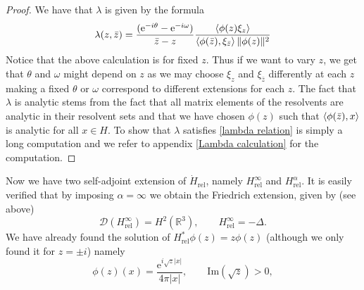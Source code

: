 \documentclass[a4paper,11pt]{article}
\newcommand{\euler}[1]{\text{e}^{#1}}
\newcommand{\Imag}{\text{Im}}
\newcommand{\dom}[1]{\mathscr D\left(#1\right)}
\newcommand{\R}{\mathbb{R}}
\numberwithin{equation}{section}
\begin{document}
\begin{proof}
	We have that $ \lambda $ is given by the formula \begin{equation}
	\lambda(z,\bar{z})=\frac{(\euler{-i\theta}-\euler{-i\omega})}{\bar{z}-z}\frac{\braket{\phi(z)\xi_{z}}}{\braket{\phi(\bar{z}),\xi_{\bar{z}}}\|\phi(z)\|^2}
	\end{equation}
Notice that the above calculation is for fixed $ z $. Thus if we want to vary $ z $, we get that $ \theta $ and $ \omega $ might depend on $ z $ as we may choose $ \xi_z $ and $ \xi_{\bar{z}} $ differently at each $ z $ making a fixed $ \theta $ or $ \omega $ correspond to different extensions for  each $ z $.
 The fact that $ \lambda $ is analytic stems from the fact that all matrix elements of the resolvents are analytic in their resolvent sets and that we have chosen $ \phi(z) $ such that $ \braket{\phi(\bar{z}),x} $ is analytic for all $ x\in H $. To show that $ \lambda $ satisfies \eqref{lambda relation} is simply a long computation and we refer to appendix \ref{Lambda calculation} for the computation. 
\end{proof}
Now we have two self-adjoint extension of $ \dot{H}_{\text{rel}} $, namely $ H_{\text{rel}}^\infty $ and $ H_{\text{rel}}^{\alpha} $. It is easily verified that by imposing $ \alpha=\infty $ we obtain the Friedrich extension, given by (see above)\begin{equation}
\dom{H_{\text{rel}}^\infty}=H^2(\R^3),\qquad H_{\text{rel}}^\infty=-\Delta.
\end{equation}  We have already found the solution of $ H_{\text{rel}}^*\phi(z)=z\phi(z) $ (although we only found it for $ z=\pm i $) namely\begin{equation}
\phi(z)(x)=\frac{\euler{i\sqrt{z}|x|}}{4\pi|x|},\qquad \Imag(\sqrt{z})>0,
\end{equation}
\end{document}
